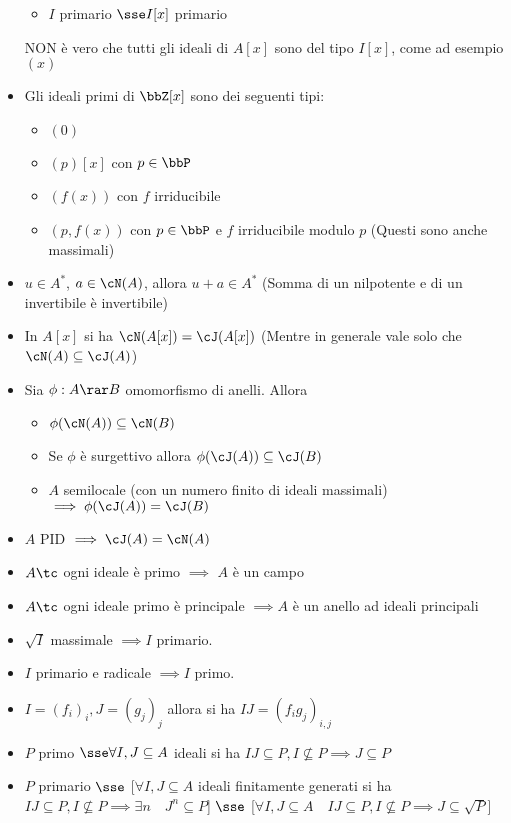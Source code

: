 \documentclass[a4paper,NoNotes,GeneralMath]{stdmdoc}
\begin{document}
\begin{itemize}
\begin{itemize}
				\item $I$ primario $\sse I[x]$ primario
			\end{itemize}
			NON è vero che tutti gli ideali di $A[x]$ sono del tipo $I[x]$, come ad esempio $(x)$
		\item Gli ideali primi di $\bbZ[x]$ sono dei seguenti tipi:
			\begin{itemize}
				\item $(0)$
				\item $(p)[x]$ con $p \in \bbP$
				\item $(f(x))$ con $f$ irriducibile
				\item $(p, f(x))$ con $p \in \bbP$ e $f$ irriducibile modulo $p$ (Questi sono anche massimali)
			\end{itemize}
		\item $u \in A^*$, $a \in \cN(A)$, allora $u + a \in A^*$ (Somma di un nilpotente e di un invertibile è invertibile)
		\item In $A[x]$ si ha $\cN(A[x]) = \cJ(A[x])$ (Mentre in generale vale solo che $\cN(A) \subseteq \cJ(A)$)
		\item Sia $\phi: A \rar B$ omomorfismo di anelli. Allora
			\begin{itemize}
				\item $\phi(\cN(A)) \subseteq \cN(B)$
				\item Se $\phi$ è surgettivo allora $\phi(\cJ(A)) \subseteq \cJ(B)$
				\item $A$ semilocale (con un numero finito di ideali massimali) $\implies \phi(\cJ(A)) = \cJ(B)$
			\end{itemize}
		\item $A$ PID $\implies \cJ(A) = \cN(A)$
		\item $A \tc$ ogni ideale è primo $\implies$ $A$ è un campo
		\item $A \tc$ ogni ideale primo è principale $\implies A$ è un anello ad ideali principali
		\item $\sqrt{I}$ massimale $\implies I$ primario.
		\item $I$ primario e radicale $\implies I$ primo.
		\item $I = (f_i)_i, J = (g_j)_j$ allora si ha $IJ = (f_ig_j)_{i,j}$
		\item $P$ primo $\sse \forall I, J \subseteq A$ ideali si ha $IJ \subseteq P, I \not\subseteq P \implies J \subseteq P$
		\item $P$ primario $\sse$ [$\forall I, J \subseteq A$ ideali finitamente generati si ha $IJ \subseteq P, I \not\subseteq P \implies \exists n \quad J^n \subseteq P$] $\sse$ [$\forall I, J \subseteq A \quad IJ \subseteq P, I \not\subseteq P \implies J \subseteq \sqrt{P}$]

\end{itemize}
\end{document}
